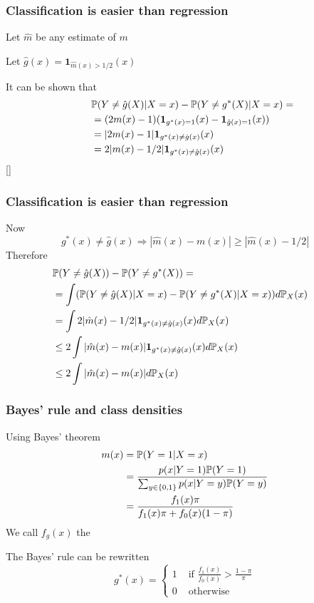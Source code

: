\documentclass[12pt]{beamer}
\begin{document}
\begin{frame}
\frametitle{Classification is easier than regression}
Let $\hat{m}$ be any estimate of $m$

\vsp
Let $\hat{g}(x) = \mathbf{1}_{\hat{m}(x) > 1/2}(x)$

\vsp
It can be shown that
\begin{align*}
  \lefteqn{\P(Y \neq \hat{g}(X) | X = x) - \P(Y \neq g^*(X) | X = x) =}  \\
  & = 
(2m(x) - 1)(\mathbf{1}_{g^*(x) = 1}(x) - \mathbf{1}_{\hat{g}(x) = 1}(x)) \\
& = |2m(x) - 1|\mathbf{1}_{g^*(x)\neq \hat{g}(x) }(x)  \\
& =  2|m(x) - 1/2|\mathbf{1}_{g^*(x)\neq \hat{g}(x) }(x) 
\end{align*}
[]
\end{frame}

\begin{frame}
\frametitle{Classification is easier than regression}
Now
\[
g^*(x)\neq \hat{g}(x) \Rightarrow |\hat{m}(x) - m(x)| \geq |\hat{m}(x) - 1/2|
\]
Therefore
\begin{align*}
 \lefteqn{\P(Y \neq \hat{g}(X)) - \P(Y \neq g^*(X)) =}\\
& =  \int(\P(Y \neq \hat{g}(X) | X = x) - \P(Y \neq g^*(X) | X = x))d\P_X(x)   \\
& =  \int 2|\hat{m}(x) - 1/2|\mathbf{1}_{g^*(x)\neq \hat{g}(x) }(x)d\P_X(x)  \\
& \leq  2\int |\hat{m}(x) - m(x)| \mathbf{1}_{g^*(x)\neq \hat{g}(x) }(x)d\P_X(x) \\
& \leq  2\int |\hat{m}(x) - m(x)|d\P_X(x) 
\end{align*}
\end{frame}

\begin{frame}
\frametitle{Bayes' rule and class densities}
Using Bayes' theorem
\begin{align*}
m(x) & = \P(Y = 1 | X = x) \\
& =
\frac{p(x|Y = 1) \P(Y = 1)}{\sum_{y \in \{0,1\}} p(x|Y = y) \P(Y = y)} \\
& =
\frac{f_1(x) \pi}{ f_1(x)\pi + f_0(x)(1-\pi)}
\end{align*}
We call $f_g(x)$ the 

\vsp
The Bayes' rule can be rewritten\Note
\[
g^*(x) = 
\begin{cases}
1 & \textrm{ if } \frac{f_1(x)}{f_0(x)} > \frac{1-\pi}{\pi} \\
0  &  \textrm{ otherwise}
\end{cases}
\]
\end{frame}
\end{document}
